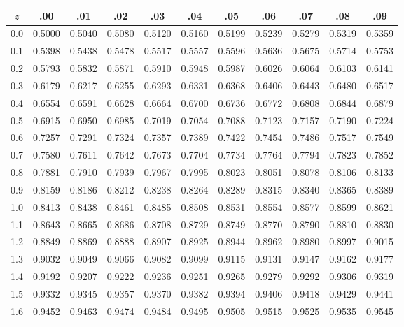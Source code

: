 \begin{center}
\renewcommand{\arraystretch}{1}
\begin{tabular}{c|cccccccccc}
\toprule
$z$ & .00 & .01 & .02 & .03 & .04 & .05 & .06 & .07 & .08 & .09 \\
\midrule
0.0 & 0.5000 & 0.5040 & 0.5080 & 0.5120 & 0.5160 & 0.5199 & 0.5239 & 0.5279 & 0.5319 & 0.5359 \\
0.1 & 0.5398 & 0.5438 & 0.5478 & 0.5517 & 0.5557 & 0.5596 & 0.5636 & 0.5675 & 0.5714 & 0.5753 \\
0.2 & 0.5793 & 0.5832 & 0.5871 & 0.5910 & 0.5948 & 0.5987 & 0.6026 & 0.6064 & 0.6103 & 0.6141 \\
0.3 & 0.6179 & 0.6217 & 0.6255 & 0.6293 & 0.6331 & 0.6368 & 0.6406 & 0.6443 & 0.6480 & 0.6517 \\
0.4 & 0.6554 & 0.6591 & 0.6628 & 0.6664 & 0.6700 & 0.6736 & 0.6772 & 0.6808 & 0.6844 & 0.6879 \\
0.5 & 0.6915 & 0.6950 & 0.6985 & 0.7019 & 0.7054 & 0.7088 & 0.7123 & 0.7157 & 0.7190 & 0.7224 \\
0.6 & 0.7257 & 0.7291 & 0.7324 & 0.7357 & 0.7389 & 0.7422 & 0.7454 & 0.7486 & 0.7517 & 0.7549 \\
0.7 & 0.7580 & 0.7611 & 0.7642 & 0.7673 & 0.7704 & 0.7734 & 0.7764 & 0.7794 & 0.7823 & 0.7852 \\
0.8 & 0.7881 & 0.7910 & 0.7939 & 0.7967 & 0.7995 & 0.8023 & 0.8051 & 0.8078 & 0.8106 & 0.8133 \\
0.9 & 0.8159 & 0.8186 & 0.8212 & 0.8238 & 0.8264 & 0.8289 & 0.8315 & 0.8340 & 0.8365 & 0.8389 \\
1.0 & 0.8413 & 0.8438 & 0.8461 & 0.8485 & 0.8508 & 0.8531 & 0.8554 & 0.8577 & 0.8599 & 0.8621 \\
1.1 & 0.8643 & 0.8665 & 0.8686 & 0.8708 & 0.8729 & 0.8749 & 0.8770 & 0.8790 & 0.8810 & 0.8830 \\
1.2 & 0.8849 & 0.8869 & 0.8888 & 0.8907 & 0.8925 & 0.8944 & 0.8962 & 0.8980 & 0.8997 & 0.9015 \\
1.3 & 0.9032 & 0.9049 & 0.9066 & 0.9082 & 0.9099 & 0.9115 & 0.9131 & 0.9147 & 0.9162 & 0.9177 \\
1.4 & 0.9192 & 0.9207 & 0.9222 & 0.9236 & 0.9251 & 0.9265 & 0.9279 & 0.9292 & 0.9306 & 0.9319 \\
1.5 & 0.9332 & 0.9345 & 0.9357 & 0.9370 & 0.9382 & 0.9394 & 0.9406 & 0.9418 & 0.9429 & 0.9441 \\
1.6 & 0.9452 & 0.9463 & 0.9474 & 0.9484 & 0.9495 & 0.9505 & 0.9515 & 0.9525 & 0.9535 & 0.9545 \\

\end{tabular}
\end{center}
